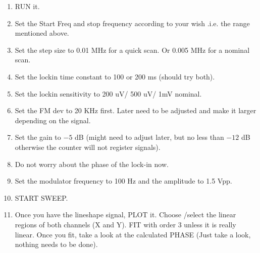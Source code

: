 {\begin{enumerate}
%
%
%

\item RUN it.

\item Set the Start Freq and stop frequency according to your wish .i.e. the range mentioned above.

\item Set the step size to 0.01 MHz for a quick scan. Or 0.005 MHz for a 
nominal scan.

\item Set the lockin time constant to 100 or 200 ms (should try both).

\item Set the lockin sensitivity to 200 uV/ 500 uV/ 1mV nominal.

\item Set the FM dev to 20 KHz first. Later need to be adjusted and make it 
larger depending on the signal. 

\item Set the gain to $-5$ dB (might need to adjust later, but no less than 
$-12$ dB otherwise the counter will not register signals).

\item Do not worry about the phase of the lock-in now.

\item Set the modulator frequency to 100 Hz and the amplitude to 1.5 Vpp.

\item START SWEEP.

\item Once you have the lineshape signal, PLOT it. Choose /select the linear 
regions of both channels (X and Y). FIT with order 3 unless it is really 
linear. Once you fit, take a look at the calculated PHASE (Just take a look, 
nothing needs to be done).


\end{enumerate}}
